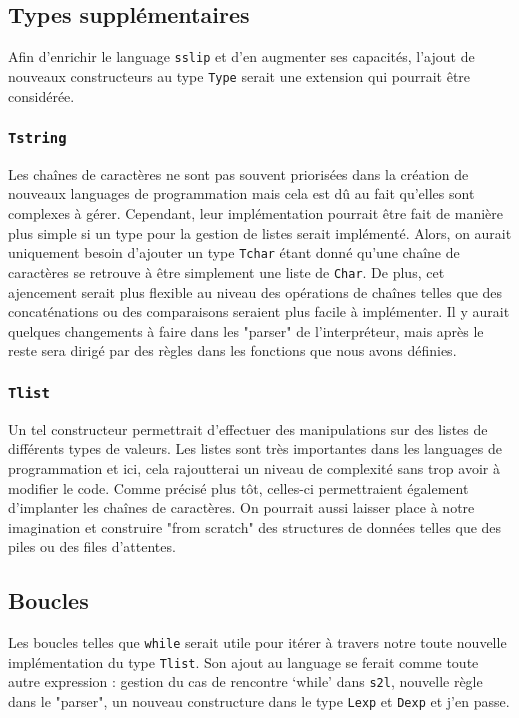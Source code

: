 \documentclass[a4paper,12pt]{article}
\begin{document}
    \subsection{Types supplémentaires}
        Afin d'enrichir le language \texttt{sslip} et d'en augmenter ses capacités, l'ajout de 
        nouveaux constructeurs au type \texttt{Type} serait une extension qui pourrait être 
        considérée.
        \subsubsection{\texttt{Tstring}}
            Les chaînes de caractères ne sont pas souvent priorisées dans la création de nouveaux
            languages de programmation mais cela est dû au fait qu'elles sont complexes à gérer.
            Cependant, leur implémentation pourrait être fait de manière plus simple si un type
            pour la gestion de listes serait implémenté. Alors, on aurait uniquement besoin 
            d'ajouter un type \texttt{Tchar} étant donné qu'une chaîne de caractères se retrouve
            à être simplement une liste de \texttt{Char}. De plus, cet ajencement serait plus
            flexible au niveau des opérations de chaînes telles que des concaténations ou des 
            comparaisons seraient plus facile à implémenter. Il y aurait quelques changements 
            à faire dans les "parser" de l'interpréteur, mais après le reste sera dirigé par 
            des règles dans les fonctions que nous avons définies.
        \subsubsection{\texttt{Tlist}}
            Un tel constructeur permettrait d'effectuer des manipulations sur des listes
            de différents types de valeurs. Les listes sont très importantes dans les 
            languages de programmation et ici, cela rajoutterai un niveau de complexité 
            sans trop avoir à modifier le code. Comme précisé plus tôt, celles-ci permettraient
            également d'implanter les chaînes de caractères. On pourrait aussi laisser
            place à notre imagination et construire "from scratch" des structures de données
            telles que des piles ou des files d'attentes.
    \subsection{Boucles}
        Les boucles telles que \texttt{while} serait utile pour itérer à travers notre toute 
        nouvelle implémentation du type \texttt{Tlist}. Son ajout au language se ferait comme 
        toute autre expression : gestion du cas de rencontre `while' dans \texttt{s2l}, nouvelle
        règle dans le "parser", un nouveau constructure dans le type \texttt{Lexp} et \texttt{Dexp}
        et j'en passe.
\end{document}
